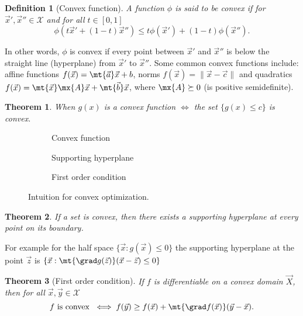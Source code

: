 \documentclass[margin=small]{hsrzf}
\newtheorem{defn}{Definition}
\newtheorem{thm}{Theorem}
\begin{document}
\begin{defn}[Convex function]
  A function $\phi$ is said to be convex if for $\vec{x}', \vec{x}'' \in
  \mathcal{X}$ and for all $t \in [0,1]$
  \[
    \phi(t\vec{x}' + (1-t)\vec{x}'')
    \leq t\phi(\vec{x}') + (1-t)\phi(\vec{x}'').
  \]
\end{defn}
In other words, $\phi$ is convex if every point between $\vec{x}'$ and
$\vec{x}''$ is below the straight line (hyperplane) from $\vec{x}'$ to
$\vec{x}''$. Some common convex functions include: affine functions
$f(\vec{x}) = \mt{\vec{a}} \vec{x} + b$, norms $f(\vec{x}) = \|\vec{x} -
\vec{c}\|$ and quadratics $f(\vec{x}) = \mt{\vec{x}}\mx{A}\vec{x} +
\mt{\vec{b}}\vec{x}$, where $\mx{A} \succeq 0$ (is positive semidefinite). 

\begin{thm}
  When $g(x)$ is a convex function $\iff$ the set $\{g(x) \leq c\}$ is convex.
\end{thm}

\begin{figure*} \centering
  \begin{subfigure}{.3\linewidth}
    \skelfig[width=\linewidth]
    \caption{Convex function}
  \end{subfigure}
  \hfill
  \begin{subfigure}{.3\linewidth}
    \skelfig[width=\linewidth]
    \caption{Supporting hyperplane}
  \end{subfigure}
  \hfill
  \begin{subfigure}{.3\linewidth}
    \skelfig[width=\linewidth]
    \caption{First order condition}
  \end{subfigure}
  \caption{
    Intuition for convex optimization.
  }
\end{figure*}

\begin{thm}
  If a set is convex, then there exists a supporting hyperplane at every point
  on its boundary.
\end{thm}
For example for the half space $\{\vec{x} : g(\vec{x}) \leq 0\}$ the supporting
hyperplane at the point $\vec{z}$ is $\{\vec{x}: \mt{\grad g(\vec{z})} (\vec{x}
- \vec{z}) \leq 0\}$

\begin{thm}[First order condition]
  If $f$ is differentiable on a convex domain $\vec{X}$, then for all
  $\vec{x}, \vec{y} \in \mathcal{X}$
  \[
    f \text{ is convex } \iff
    f(\vec{y}) \geq f(\vec{x}) + \mt{\grad f(\vec{x})} (\vec{y} - \vec{x}).
  \]
\end{thm}
\end{document}
